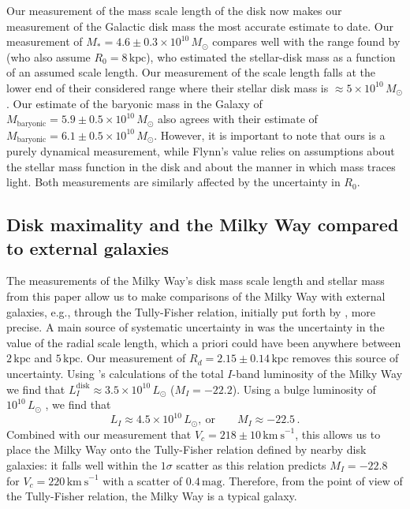 \documentclass{emulateapj}
\newcommand{\eg}{e.g.}
\newcommand{\kpc}{\ensuremath{\,\mathrm{kpc}}}
\newcommand{\kms}{\ensuremath{\,\mathrm{km\ s}^{-1}}}
\begin{document}
Our measurement of the mass scale length of the disk now makes our
measurement of the Galactic disk mass the most accurate estimate to
date. Our measurement of $M_{*} = 4.6\pm0.3\times10^{10}\,M_\odot$
compares well with the range found by \citet{Flynn06a} (who also
assume $R_0 = 8\kpc$), who estimated the stellar-disk mass as a
function of an assumed scale length. Our measurement of the scale
length falls at the lower end of their considered range where their
stellar disk mass is $\approx5\times10^{10}\,M_\odot$. Our estimate of
the baryonic mass in the Galaxy of $M_{\mathrm{baryonic}} =
5.9\pm0.5\times10^{10}\,M_\odot$ also agrees with their estimate of
$M_{\mathrm{baryonic}} = 6.1\pm0.5\times10^{10}\,M_\odot$. However, it
is important to note that ours is a purely dynamical measurement,
while Flynn's value relies on assumptions about the stellar mass
function in the disk and about the manner in which mass traces
light. Both measurements are similarly affected by the uncertainty in
$R_0$.

\subsection{Disk maximality and the Milky Way compared to external galaxies}\label{sec:cfexternal}

The measurements of the Milky Way's disk mass scale length and stellar
mass from this paper allow us to make comparisons of the Milky Way
with external galaxies, \eg, through the Tully-Fisher relation,
initially put forth by \citet{Flynn06a}, more precise. A main source
of systematic uncertainty in \citet{Flynn06a} was the uncertainty in
the value of the radial scale length, which a priori could have been
anywhere between $2\kpc$ and $5\kpc$. Our measurement of $R_d =
2.15\pm0.14\kpc$ removes this source of uncertainty. Using
\citet{Flynn06a}'s calculations of the total $I$-band luminosity of
the Milky Way we find that $L_I^{\mathrm{disk}} \approx
3.5\times10^{10}\,L_\odot$ ($M_I = -22.2$). Using a bulge luminosity
of $10^{10}\,L_\odot$ \citep{Kent91a}, we find that
\begin{equation}
  L_I \approx 4.5\times10^{10}\,L_\odot, \ \mathrm{or}\qquad M_I \approx -22.5\,.
\end{equation}
Combined with our measurement that $V_c = 218\pm10\kms$, this allows
us to place the Milky Way onto the Tully-Fisher relation defined by
nearby disk galaxies: it falls well within the $1\sigma$ scatter
\citep[\eg,][]{Dale99a} as this relation predicts $M_I = -22.8$ for
$V_c = 220\kms$ with a scatter of $0.4\,\mathrm{mag}$. Therefore, from
the point of view of the Tully-Fisher relation, the Milky Way is a
typical galaxy.
\end{document}
